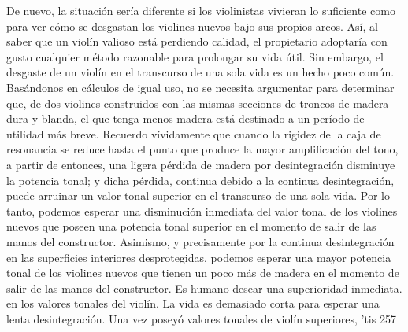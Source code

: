De nuevo, la situación sería diferente si los violinistas vivieran lo suficiente como para ver cómo se desgastan los violines nuevos bajo sus propios arcos. Así, al saber que un violín valioso está perdiendo calidad, el propietario adoptaría con gusto cualquier método razonable para prolongar su vida útil. Sin embargo, el desgaste de un violín en el transcurso de una sola vida es un hecho poco común.
Basándonos en cálculos de igual uso, no se necesita argumentar para determinar que, de dos violines construidos con las mismas secciones de troncos de madera dura y blanda, el que tenga menos madera está destinado a un período de utilidad más breve. Recuerdo vívidamente que cuando la rigidez de la caja de resonancia se reduce hasta el punto que produce la mayor amplificación del tono, a partir de entonces, una ligera pérdida de madera por desintegración disminuye la potencia tonal; y dicha pérdida, continua debido a la continua desintegración, puede arruinar un valor tonal superior en el transcurso de una sola vida. Por lo tanto, podemos esperar una disminución inmediata del valor tonal de los violines nuevos que poseen una potencia tonal superior en el momento de salir de las manos del constructor. Asimismo, y precisamente por la continua desintegración en las superficies interiores desprotegidas, podemos esperar una mayor potencia tonal de los violines nuevos que tienen un poco más de madera en el momento de salir de las manos del constructor. Es humano desear una superioridad inmediata.
en los valores tonales del violín.
La vida es demasiado corta para esperar una lenta desintegración.
Una vez poseyó valores tonales de violín superiores, 'tis 257

